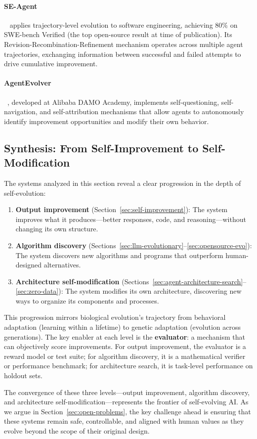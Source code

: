 \paragraph{SE-Agent}~\citep{seagent2025} applies trajectory-level evolution to software engineering, achieving 80\% on SWE-bench Verified (the top open-source result at time of publication). Its Revision-Recombination-Refinement mechanism operates across multiple agent trajectories, exchanging information between successful and failed attempts to drive cumulative improvement.

\paragraph{AgentEvolver}~\citep{agentevolver2025}, developed at Alibaba DAMO Academy, implements self-questioning, self-navigation, and self-attribution mechanisms that allow agents to autonomously identify improvement opportunities and modify their own behavior.

\subsection{Synthesis: From Self-Improvement to Self-Modification}
\label{sec:synthesis-evo}

The systems analyzed in this section reveal a clear progression in the depth of self-evolution:

\begin{enumerate}
    \item \textbf{Output improvement} (Section~\ref{sec:self-improvement}): The system improves what it produces---better responses, code, and reasoning---without changing its own structure.
    \item \textbf{Algorithm discovery} (Sections~\ref{sec:llm-evolutionary}--\ref{sec:opensource-evo}): The system discovers new algorithms and programs that outperform human-designed alternatives.
    \item \textbf{Architecture self-modification} (Sections~\ref{sec:agent-architecture-search}--\ref{sec:zero-data}): The system modifies its own architecture, discovering new ways to organize its components and processes.
\end{enumerate}

This progression mirrors biological evolution's trajectory from behavioral adaptation (learning within a lifetime) to genetic adaptation (evolution across generations). The key enabler at each level is the \textbf{evaluator}: a mechanism that can objectively score improvements. For output improvement, the evaluator is a reward model or test suite; for algorithm discovery, it is a mathematical verifier or performance benchmark; for architecture search, it is task-level performance on holdout sets.

The convergence of these three levels---output improvement, algorithm discovery, and architecture self-modification---represents the frontier of self-evolving AI. As we argue in Section~\ref{sec:open-problems}, the key challenge ahead is ensuring that these systems remain safe, controllable, and aligned with human values as they evolve beyond the scope of their original design.

